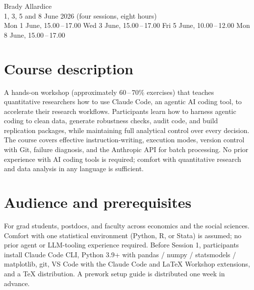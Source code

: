 \documentclass[11pt]{article}
\begin{document}
\thispagestyle{fancy}

\noindent{\color{redesteal}\rule{\linewidth}{1.5pt}}\par
\vspace{0.5em}
\vspace{0.5em}
\vspace{0.4em}
\noindent{\color{redesteal}\rule{\linewidth}{0.5pt}}\par
\vspace{1.4em}

 Brady Allardice \\
 1, 3, 5 and 8 June 2026 (four sessions, eight hours) \\
 Mon 1 June, 15.00\,--\,17.00 \textbullet{} Wed 3 June, 15.00\,--\,17.00 \textbullet{} Fri 5 June, 10.00\,--\,12.00 \textbullet{} Mon 8 June, 15.00\,--\,17.00

\section*{Course description}

A hands-on workshop (approximately 60\,--\,70\% exercises) that teaches quantitative researchers how to use Claude Code, an agentic AI coding tool, to accelerate their research workflows. Participants learn how to harness agentic coding to clean data, generate robustness checks, audit code, and build replication packages, while maintaining full analytical control over every decision. The course covers effective instruction-writing, execution modes, version control with Git, failure diagnosis, and the Anthropic API for batch processing. No prior experience with AI coding tools is required; comfort with quantitative research and data analysis in any language is sufficient.

\section*{Audience and prerequisites}

For grad students, postdocs, and faculty across economics and the social sciences. Comfort with one statistical environment (Python, R, or Stata) is assumed; no prior agent or LLM-tooling experience required. Before Session 1, participants install Claude Code CLI, Python 3.9+ with pandas / numpy / statsmodels / matplotlib, git, VS Code with the Claude Code and LaTeX Workshop extensions, and a TeX distribution. A prework setup guide is distributed one week in advance.
\end{document}
